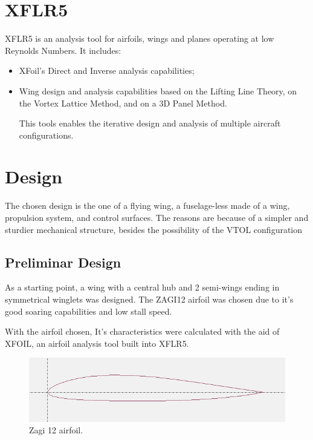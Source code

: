 \section{XFLR5}

XFLR5 is an analysis tool for airfoils, wings and planes operating at low Reynolds Numbers. It includes:
\begin{itemize}

\item XFoil's Direct and Inverse analysis capabilities;
\item Wing design and analysis capabilities based on the Lifting Line Theory, on the Vortex Lattice Method, and on a 3D Panel Method.

This tools enables the iterative design and analysis of multiple aircraft configurations.


\end{itemize}


\section{Design}

The chosen design is the one of a flying wing, a fuselage-less made of a wing, propulsion system, and control surfaces. The reasons are because of a simpler and sturdier mechanical structure, besides the possibility of the VTOL configuration

\subsection{Preliminar Design}

As a starting point, a wing with a central hub and 2 semi-wings ending in symmetrical winglets was designed. The ZAGI12 airfoil was chosen due to it's good soaring capabilities and low stall speed.

With the airfoil chosen, It's characteristics were calculated with the aid of XFOIL, an airfoil analysis tool built into XFLR5.

\begin{figure}
\centering
  \includegraphics[width=\linewidth]{figs/zagi12.png}
  \caption{Zagi 12 airfoil.}
  \label{fig:zagi12}
\end{figure}



